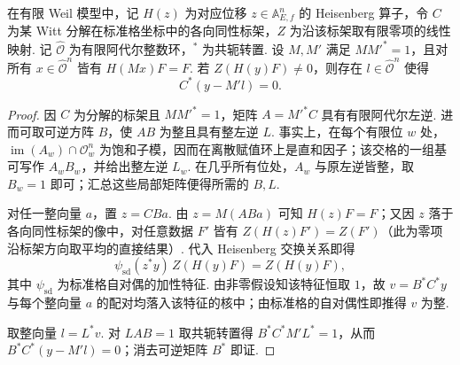\begin{lemma}[有限零项的格支集]
\label{lem:a-finite-zero-term-support}
\emitthmsource
在有限 Weil 模型中，记 $H(z)$ 为对应位移 $z\in\mathbb A_{E,f}^{n}$ 的 Heisenberg 算子，令 $C$ 为某 Witt 分解在标准格坐标中的各向同性标架，$Z$ 为沿该标架取有限零项的线性映射. 记 $\widehat{\mathcal O}$ 为有限阿代尔整数环，$^\ast$ 为共轭转置. 设 $M,M'$ 满足 $MM'^\ast=1$，且对所有 $x\in\widehat{\mathcal O}^{n}$ 皆有 $H(Mx)F=F$. 若 $Z(H(y)F)\ne0$，则存在 $l\in\widehat{\mathcal O}^{n}$ 使得
\[
 C^\ast(y-M'l)=0.
\]
\end{lemma}
\begin{proof}
因 $C$ 为分解的标架且 $MM'^\ast=1$，矩阵 $A=M'^\ast C$ 具有有限阿代尔左逆. 进而可取可逆方阵 $B$，使 $AB$ 为整且具有整左逆 $L$. 事实上，在每个有限位 $w$ 处，$\operatorname{im}(A_w)\cap\mathcal O_w^n$ 为饱和子模，因而在离散赋值环上是直和因子；该交格的一组基可写作 $A_wB_w$，并给出整左逆 $L_w$. 在几乎所有位处，$A_w$ 与原左逆皆整，取 $B_w=1$ 即可；汇总这些局部矩阵便得所需的 $B,L$.

对任一整向量 $a$，置 $z=CBa$. 由 $z=M(ABa)$ 可知 $H(z)F=F$；又因 $z$ 落于各向同性标架的像中，对任意数据 $F'$ 皆有 $Z(H(z)F')=Z(F')$（此为零项沿标架方向取平均的直接结果）. 代入 Heisenberg 交换关系即得
\[
 \psi_{\mathrm{sd}}(z^\ast y)\,Z(H(y)F)=Z(H(y)F),
\]
其中 $\psi_{\mathrm{sd}}$ 为标准格自对偶的加性特征. 由非零假设知该特征恒取 $1$，故 $v=B^\ast C^\ast y$ 与每个整向量 $a$ 的配对均落入该特征的核中；由标准格的自对偶性即推得 $v$ 为整.

取整向量 $l=L^\ast v$. 对 $LAB=1$ 取共轭转置得 $B^\ast C^\ast M' L^\ast=1$，从而 $B^\ast C^\ast(y-M'l)=0$；消去可逆矩阵 $B^\ast$ 即证.
\end{proof}


